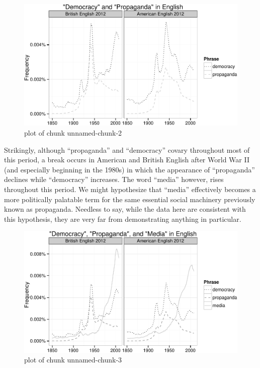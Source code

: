 \documentclass[12pt,book]{article}
\begin{document}
\begin{figure}[htbp]
\centering
\includegraphics{pacification_of_the_world_files/figure-latex/unnamed-chunk-2.pdf}
\caption{plot of chunk unnamed-chunk-2}
\end{figure}

Strikingly, although ``propaganda'' and ``democracy'' covary throughout
most of this period, a break occurs in American and British English
after World War II (and especially beginning in the 1980s) in which the
appearance of ``propaganda'' declines while ``democracy'' increases. The
word ``media'' however, rises throughout this period. We might
hypothesize that ``media'' effectively becomes a more politically
palatable term for the same essential social machinery previously known
as propaganda. Needless to say, while the data here are consistent with
this hypothesis, they are very far from demonstrating anything in
particular.

\begin{figure}[htbp]
\centering
\includegraphics{pacification_of_the_world_files/figure-latex/unnamed-chunk-3.pdf}
\caption{plot of chunk unnamed-chunk-3}
\end{figure}
\end{document}
